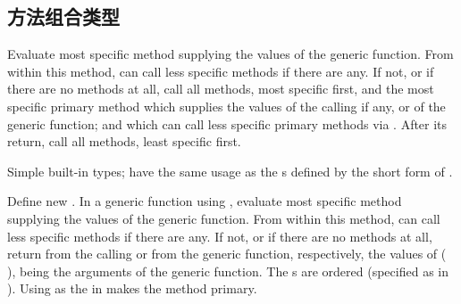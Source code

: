 \subsection{方法组合类型} 
\label{section:方法组合类型}
\begin{LIST}{1cm}

  {
  Evaluate most specific  method supplying the values of
  the generic function. From within this method, 
  can call less specific  methods if there are any. If
  not, or if there are no  methods at all, call all
   methods, most specific first, and the most specific
  primary method which supplies the values of the calling
   if any, or of the generic function; and which
  can call less specific primary methods via
  . After its return, call all 
  methods, least specific first.
  }

  {
    Simple built-in  types; have the same
    usage as the
    s defined by the short form of
    . 
  }

  {
     Define new 
    . In a generic function using ,
    evaluate most specific  method supplying the values of
    the generic function. From within this method, 
    can call less specific  methods if there are any.  If
    not, or if there are no  methods at all,
    return from the calling  or from the
    generic function, respectively, the
    values of ( ),  being the arguments of the
    generic function.
    The s are ordered
    (specified as  in ).
    Using  as the  in 
    makes the method primary.
  }


\end{LIST}
